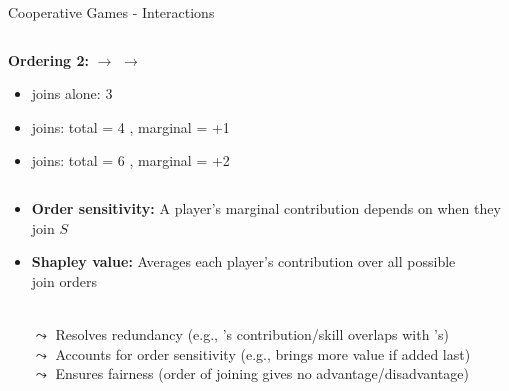 \documentclass[10pt,compress,t,notes=noshow, xcolor=table]{beamer}
\begin{document}
\begin{frame}{Cooperative Games - Interactions}
\begin{columns}[T, totalwidth=\linewidth]
\begin{column}{0.5\textwidth}
\textbf{Ordering 2:}  $\rightarrow$  $\rightarrow$ 
\begin{itemize}
  \item[\colorcircle{playerblue}{white}{3}] joins alone: 3 
  \item[\colorcircle{playerred}{white}{1}] joins: total = 4 , marginal = +1
  \item[\colorcircle{playeryellow}{white}{2}] joins: total = 6 , marginal = +2
\end{itemize}
    \end{column}
\end{columns}
\pause
\begin{itemize}
  \item \textbf{Order sensitivity:} A player's marginal contribution depends on when they join $S$
  \item \textbf{Shapley value:} Averages each player’s contribution over all possible\\ join orders


    \\$\leadsto$ Resolves redundancy (e.g., ’s contribution/skill overlaps with ’s)
    \\$\leadsto$ Accounts for order sensitivity (e.g.,  brings more value if added last)
    \\$\leadsto$ Ensures fairness (order of joining gives no advantage/disadvantage)
  

\end{itemize}
\end{frame}
\end{document}

